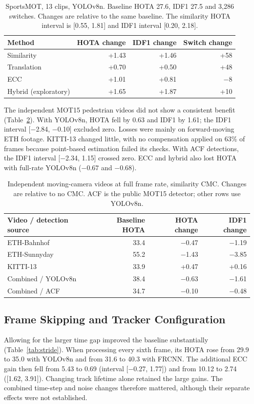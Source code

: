 \documentclass[conference]{IEEEtran}
\begin{document}
\begin{table}[t]
\caption{SportsMOT, 13 clips, YOLOv8n. Baseline HOTA 27.6, IDF1 27.5 and 3,286 switches. Changes are relative to the same baseline. The similarity HOTA interval is [0.55, 1.81] and IDF1 interval [0.20, 2.18].}
\label{tab:sports}
\centering\footnotesize\setlength{\tabcolsep}{6pt}
\begin{tabular}{@{}lrrr@{}}
\toprule
Method & HOTA change & IDF1 change & Switch change\\
\midrule
Similarity & +1.43 & +1.46 & +58\\
Translation & +0.70 & +0.50 & +48\\
ECC & +1.01 & +0.81 & $-$8\\
Hybrid (exploratory) & +1.65 & +1.87 & +10\\
\bottomrule
\end{tabular}
\end{table}

The independent MOT15 pedestrian videos did not show a consistent benefit (Table~\ref{tab:m15}). With YOLOv8n, HOTA fell by 0.63 and IDF1 by 1.61; the IDF1 interval [$-$2.84, $-$0.10] excluded zero. Losses were mainly on forward-moving ETH footage. KITTI-13 changed little, with no compensation applied on 63\% of frames because point-based estimation failed its checks. With ACF detections, the IDF1 interval [$-$2.34, 1.15] crossed zero. ECC and hybrid also lost HOTA with full-rate YOLOv8n ($-0.67$ and $-0.68$).

\begin{table}[t]
\caption{Independent moving-camera videos at full frame rate, similarity CMC. Changes are relative to no CMC. ACF is the public MOT15 detector; other rows use YOLOv8n.}
\label{tab:m15}
\centering\footnotesize\setlength{\tabcolsep}{5pt}
\begin{tabular}{@{}lrrr@{}}
\toprule
Video / detection source & Baseline HOTA & HOTA change & IDF1 change\\
\midrule
ETH-Bahnhof & 33.4 & $-$0.47 & $-$1.19\\
ETH-Sunnyday & 55.2 & $-$1.43 & $-$3.85\\
KITTI-13 & 33.9 & +0.47 & +0.16\\
Combined / YOLOv8n & 38.4 & $-$0.63 & $-$1.61\\
Combined / ACF & 34.7 & $-$0.10 & $-$0.48\\
\bottomrule
\end{tabular}
\end{table}

\subsection{Frame Skipping and Tracker Configuration}
Allowing for the larger time gap improved the baseline substantially (Table~\ref{tab:stride}). When processing every sixth frame, its HOTA rose from 29.9 to 35.0 with YOLOv8n and from 31.6 to 40.3 with FRCNN. The additional ECC gain then fell from 5.43 to 0.69 (interval [$-$0.27, 1.77]) and from 10.12 to 2.74 ([1.62, 3.91]). Changing track lifetime alone retained the large gains. The combined time-step and noise changes therefore mattered, although their separate effects were not established.
\end{document}
